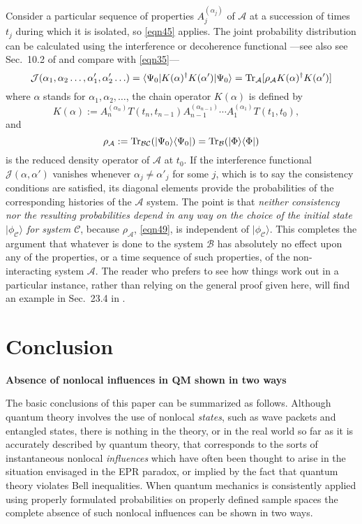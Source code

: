 \documentclass[12pt]{article} %
\def\outl#1{\par{\medskip\noindent\hspace*{.5cm}\bf
      \mathversion{bold}#1\mathversion{normal}\smallskip} }
\def\np{} \def\xa{} \def\xb{} \def\xn{} \def\xp{}
\def\outl#1{} \def\np{} \def\xa{} \def\xb{} \def\xn{} \def\xp{}
\def\outl#1{\par{\medskip\noindent\hspace*{.5cm}\bf
      \mathversion{bold}#1\mathversion{normal}\smallskip} }
\def\np{\newpage }\def\xn{\nopagebreak }\def\xp{\pagebreak }
\newcommand{\ad}{^\dagger }
\newcommand{\dya}[1]{|#1\rgl\lgl#1|}
\newcommand{\ket}[1]{|#1\rgl }
\newcommand{\lgl}{\langle }
\newcommand{\mte}[2]{\lgl#1|#2|#1\rgl }
\newcommand{\rgl}{\rangle }
\newcommand{\Tr}{{\rm Tr}}
\newcommand{\AM}{{\mathcal A}}
\newcommand{\BM}{{\mathcal B}}
\newcommand{\CM}{{\mathcal C}}
\newcommand{\JM}{{\mathcal J}}
\newcommand{\al}{\alpha }
\begin{document}
Consider a particular sequence of properties $A_j^{(\al_j)}$ of $\AM$ at a
succession of times $t_j$ during which it is isolated, so \eqref{eqn45}
applies.  The joint probability distribution can be calculated using the
interference or decoherence functional \cite{GMHr93}---see also see Sec.~10.2
of \cite{Grff02c} and compare with \eqref{eqn35}---
\begin{equation}
  \JM(\al_1,\al_2\ldots,\al'_1,\al'_2\ldots) =
  \mte{\Psi_0}{K(\al)\ad K(\al')} = \Tr_\AM[\rho_\AM K(\al)\ad K(\al')]
\label{eqn47}
\end{equation}
where $\al$ stands for $\al_1,\al_2,\ldots$, the chain operator $K(\al)$ is
defined by
\begin{equation}
  K(\al) := A_n^{(\al_n)}T(t_{n},t_{n-1})A_{n-1}^{(\al_{n-1})} \cdots 
  A_1^{(\al_1)} T(t_1,t_0), \quad
\label{eqn48}
\end{equation}
and 
\begin{equation}
\rho_\AM := \Tr_{\BM\CM}(\dya{\Psi_0})
 = \Tr_\BM( \dya{\Phi})  
\label{eqn49}
\end{equation}
is the reduced density operator of $\AM$ at $t_0$.  If the interference
functional $\JM(\al,\al')$ vanishes whenever $\al_j\neq \al'_j$ for some $j$,
which is to say the consistency conditions are satisfied, its diagonal
elements provide the probabilities of the corresponding histories of the $\AM$
system.  The point is that \emph{neither consistency nor the resulting
  probabilities depend in any way on the choice of the initial state
  $\ket{\phi_\CM}$ for system $\CM$}, because $\rho_\AM$, \eqref{eqn49}, is
independent of $\ket{\phi_\CM}$.  This completes the argument that whatever is
done to the system $\BM$ has absolutely no effect upon any of the properties,
or a time sequence of such properties, of the non-interacting system $\AM$.
The reader who prefers to see how things work out in a particular instance,
rather than relying on the general proof given here, will find an example in
Sec.~23.4 in \cite{Grff02c}.

\xb
\section{Conclusion}
\label{sct7}
\xa

\xb
\outl{Absence of nonlocal influences in QM shown in two ways}
\xa


The basic conclusions of this paper can be summarized as follows.  Although
quantum theory involves the use of nonlocal \emph{states}, such as wave
packets and entangled states, there is nothing in the theory, or in the real
world so far as it is accurately described by quantum theory, that corresponds
to the sorts of instantaneous nonlocal \emph{influences} which have often been
thought to arise in the situation envisaged in the EPR paradox, or implied by
the fact that quantum theory violates Bell inequalities.  When quantum
mechanics is consistently applied using properly formulated probabilities on
properly defined sample spaces the complete absence of such nonlocal
influences can be shown in two ways.
\end{document}

